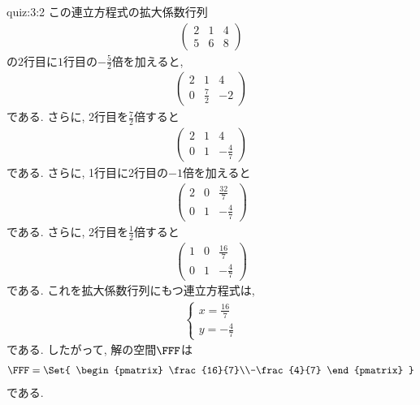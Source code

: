 \begin{answerof}{quiz:3:2}
  この連立方程式の拡大係数行列
  \begin{align*}
    \begin{pmatrix}
      2&1&4\\5&6&8
    \end{pmatrix}
  \end{align*}
  の$2$行目に$1$行目の$-\frac{5}{2}$倍を加えると,
  \begin{align*}
    \begin{pmatrix}
      2&1&4\\0&\frac{7}{2}&-2
    \end{pmatrix}
  \end{align*}
  である. さらに,
  2行目を$\frac{7}{2}$倍すると
  \begin{align*}
    \begin{pmatrix}
      2&1&4\\0&1&-\frac{4}{7}
    \end{pmatrix}
  \end{align*}
  である. さらに,
  1行目に2行目の$-1$倍を加えると
  \begin{align*}
    \begin{pmatrix}
      2&0&\frac{32}{7}\\0&1&-\frac{4}{7}
    \end{pmatrix}
  \end{align*}
  である. さらに,
  2行目を$\frac{1}{2}$倍すると
  \begin{align*}
    \begin{pmatrix}
      1&0&\frac{16}{7}\\0&1&-\frac{4}{7}
    \end{pmatrix}
  \end{align*}
  である.
  これを拡大係数行列にもつ連立方程式は,
  \begin{align*}
    \begin{cases}
      x=\frac{16}{7}\\
      y=-\frac{4}{7}
    \end{cases}
  \end{align*}
  である. したがって,
  解の空間$\FFF$は
  \begin{align*}
    \FFF=\Set{
    \begin{pmatrix}
      \frac{16}{7}\\-\frac{4}{7}
    \end{pmatrix}
    }
  \end{align*}
  である.


\end{answerof}
